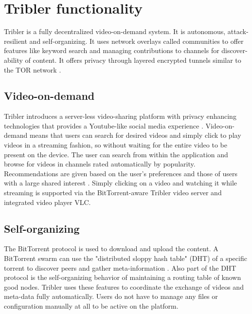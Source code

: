 \chapter{Tribler functionality}\label{ch:tribler}

Tribler is a fully decentralized video-on-demand system. \cite{TriblerOverviewJournal, tribler2014play, tribler-anon-hd}
It is autonomous, attack-resilient and self-organizing. \cite{votecast, tribler-gossip}
It uses network overlays called communities to offer features like keyword search and managing contributions to channels for discover-ability of content.
It offers privacy through layered encrypted tunnels similar to the TOR network \cite{tribler2014at3, dingledine2004tor, dingledine2006design}.


\section{Video-on-demand}
Tribler introduces a server-less video-sharing platform with privacy enhancing technologies that provides a Youtube-like social media experience \cite{PawelOffloading}.
Video-on-demand means that users can search for desired videos and simply click to play videos in a streaming fashion, so without waiting for the entire video to be present on the device.
The user can search from within the application \cite{p2p_search} and browse for videos in channels rated automatically by popularity.
Recommendations are given based on the user's preferences and those of users with a large shared interest  \cite{Wang:SIGIR2007,ClementsIR2007}.
Simply clicking on a video and watching it while streaming is supported via the BitTorrent-aware Tribler video server and integrated video player VLC.


\section{Self-organizing}
The BitTorrent protocol is used to download and upload the content.
A BitTorrent swarm can use the "distributed sloppy hash table" (DHT) of a specific torrent to discover peers and gather meta-information \cite{secure_swarm_discovery, swarm_discovery}.
Also part of the DHT protocol is the self-organizing behavior of maintaining a routing table of known good nodes.
Tribler uses these features to coordinate the exchange of videos and meta-data fully automatically.
Users do not have to manage any files or configuration manually at all to be active on the platform.


